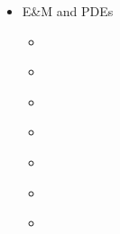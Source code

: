 \documentclass[letterpaper,10pt,english]{jupyterBook}
\begin{document}
\begin{itemize}
\item {} 
 \sphinxhyphen{} E\&M and PDEs

\begin{itemize}
\item {} 
\sphinxAtStartPar
{\hyperref[\detokenize{content/2_EM/EM_intro::doc}]{}}

\item {} 
\sphinxAtStartPar
{\hyperref[\detokenize{content/2_EM/E_fields_graphing_184::doc}]{}}

\item {} 
\sphinxAtStartPar
{\hyperref[\detokenize{content/2_EM/laplace_eq::doc}]{}}

\item {} 
\sphinxAtStartPar
{\hyperref[\detokenize{content/2_EM/more_PDEs::doc}]{}}

\item {} 
\sphinxAtStartPar
{\hyperref[\detokenize{content/2_EM/relaxation::doc}]{}}

\item {} 
\sphinxAtStartPar
{\hyperref[\detokenize{content/2_EM/B_fields::doc}]{}}

\item {} 
\sphinxAtStartPar
{\hyperref[\detokenize{content/2_EM/EM_waves::doc}]{}}

\end{itemize}
\end{itemize}
\end{document}
